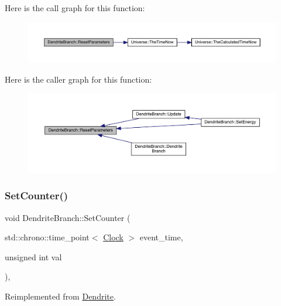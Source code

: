 Here is the call graph for this function\+:
\nopagebreak
\begin{figure}[H]
\begin{center}
\leavevmode
\includegraphics[width=350pt]{class_dendrite_branch_a70b5e63fc44166ccd7f0c7177660c250_cgraph}
\end{center}
\end{figure}
Here is the caller graph for this function\+:
\nopagebreak
\begin{figure}[H]
\begin{center}
\leavevmode
\includegraphics[width=350pt]{class_dendrite_branch_a70b5e63fc44166ccd7f0c7177660c250_icgraph}
\end{center}
\end{figure}
\mbox{\label{class_dendrite_branch_a2ce03fbad4a70564eeaafb62debd4d74}} 
\subsubsection{\texorpdfstring{Set\+Counter()}{SetCounter()}}
{\footnotesize\ttfamily void Dendrite\+Branch\+::\+Set\+Counter (\begin{DoxyParamCaption}\item[{std\+::chrono\+::time\+\_\+point$<$ \hyperlink{universe_8h_a0ef8d951d1ca5ab3cfaf7ab4c7a6fd80}{Clock} $>$}]{event\+\_\+time,  }\item[{unsigned int}]{val }\end{DoxyParamCaption})\hspace{0.3cm}{\ttfamily [inline]}, {\ttfamily [virtual]}}



Reimplemented from \hyperlink{class_dendrite_a7529495515de74fff2b9a92b12531057}{Dendrite}.



